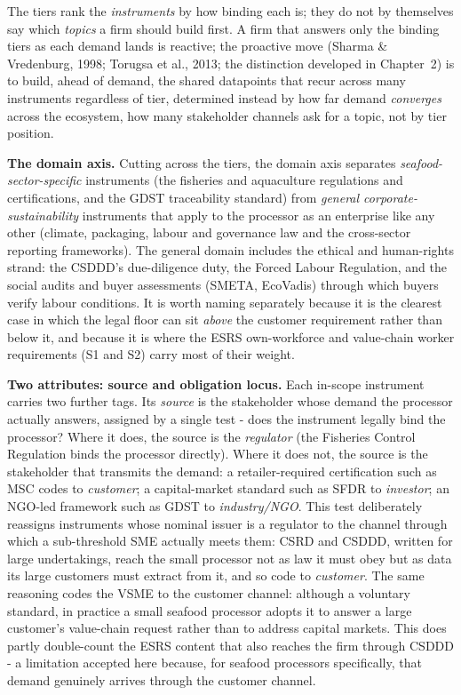 The tiers rank the \emph{instruments} by how binding each is; they do not by
themselves say which \emph{topics} a firm should build first. A firm that answers
only the binding tiers as each demand lands is reactive; the proactive move
(Sharma \& Vredenburg, 1998; Torugsa et al., 2013; the distinction developed in
Chapter~2) is to build, ahead of demand, the shared datapoints that recur across
many instruments regardless of tier, determined instead by how far demand
\emph{converges} across the ecosystem, how many stakeholder channels ask for a
topic, not by tier position.

\textbf{The domain axis.} Cutting across the tiers, the domain axis separates
\emph{seafood-sector-specific} instruments (the fisheries and aquaculture
regulations and certifications, and the GDST traceability standard) from
\emph{general corporate-sustainability} instruments that apply to the processor as
an enterprise like any other (climate, packaging, labour and governance law and
the cross-sector reporting frameworks). The general domain includes the ethical
and human-rights strand: the CSDDD's due-diligence duty, the Forced Labour
Regulation, and the social audits and buyer assessments (SMETA, EcoVadis) through
which buyers verify labour conditions. It is worth naming separately because it is the clearest case
in which the legal floor can sit \emph{above} the customer requirement rather
than below it, and because it is where the ESRS own-workforce and value-chain
worker requirements (S1 and S2) carry most of their weight.

\textbf{Two attributes: source and obligation locus.} Each in-scope instrument
carries two further tags. Its \emph{source} is the stakeholder whose demand the
processor actually answers, assigned by a single test - does the instrument
legally bind the processor? Where it does, the source is the \emph{regulator} (the
Fisheries Control Regulation binds the processor directly). Where it does not, the
source is the stakeholder that transmits the demand: a retailer-required
certification such as MSC codes to \emph{customer}; a capital-market standard such
as SFDR to \emph{investor}; an NGO-led framework such as GDST to
\emph{industry/NGO}. This test deliberately reassigns instruments whose nominal
issuer is a regulator to the channel through which a sub-threshold SME actually
meets them: CSRD and CSDDD, written for large undertakings, reach the small
processor not as law it must obey but as data its large customers must extract
from it, and so code to \emph{customer}. The same reasoning codes the VSME to the
customer channel: although a voluntary standard, in practice a small seafood
processor adopts it to answer a large customer's value-chain request rather than
to address capital markets. This does partly double-count the ESRS content that
also reaches the firm through CSDDD - a limitation accepted here because, for
seafood processors specifically, that demand genuinely arrives through the
customer channel.

